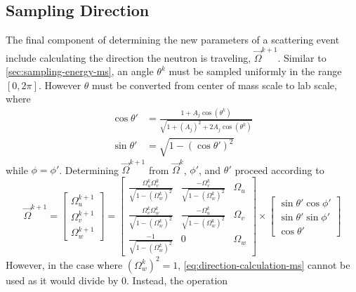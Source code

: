 \subsection{Sampling Direction}
\label{ssec:sampling-direction}
The final component of determining the new parameters of a scattering event include calculating the direction the neutron is traveling, $\overrightarrow{\Omega}^{k+1}$. Similar to \autoref{sec:sampling-energy-ms}, an angle $\theta^k$ must be sampled uniformly in the range $[0,2\pi]$. However $\theta$ must be converted from center of mass scale to lab scale, where
\begin{align}
    \cos{\theta'} &= \frac{1 + A_j \cos{\left( \theta^k \right)}}{\sqrt{1 + \left( A_j\right)^2 + 2A_j\cos{\left(\theta^k \right)}}} \\
    \sin{\theta'} &= \sqrt{1 - \left( \cos{\theta'} \right)^2}
\end{align}
while $\phi=\phi'$.
Determining $\overrightarrow{\Omega}^{k+1}$ from $\overrightarrow{\Omega}^{k}$, $\phi'$, and $\theta'$ proceed according to
\begin{equation}
    \label{eq:direction-calculation-ms}
    \overrightarrow{\Omega}^{k+1} = \begin{bmatrix}
        \Omega^{k+1}_u \\[8pt]
        \Omega^{k+1}_v \\[8pt]
        \Omega^{k+1}_w
    \end{bmatrix}
    = \begin{bmatrix}
        \frac{\Omega_{u}^{k} \Omega_{v}^{k}} { \sqrt{1 - \left(\Omega_{w}^{k}\right)^2 }} &
        \frac{-\Omega_v^k} { \sqrt{1 - \left(\Omega_{w}^{k}\right)^2 }} &
        \Omega_u \\[10pt]
        \frac{\Omega_{v}^{k} \Omega_{w}^{k}} { \sqrt{1 - \left(\Omega_{w}^{k}\right)^2 }} &
        \frac{-\Omega_u^k} { \sqrt{1 - \left(\Omega_{w}^{k}\right)^2 }} &
        \Omega_v \\[10pt]
        \frac{-1} { \sqrt{1 - \left(\Omega_{w}^{k}\right)^2 }} &
        0 &
        \Omega_w
    \end{bmatrix} \times
    \begin{bmatrix}
        \sin{\theta'}\cos{\phi'} \\[8pt]
        \sin{\theta'}\sin{\phi'} \\[8pt]
        \cos{\theta'}
    \end{bmatrix}
\end{equation}
However, in the case where $\left(\Omega_w^k\right)^2 = 1$, \autoref{eq:direction-calculation-ms} cannot be used as it would divide by 0. Instead, the operation
